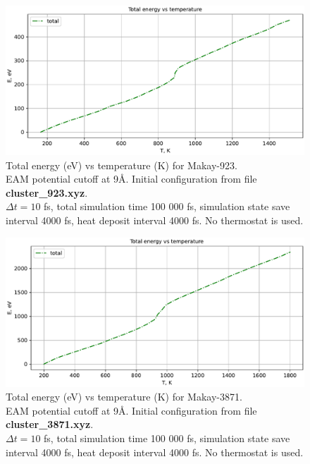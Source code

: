 \documentclass[12pt,a4paper]{article}
\begin{document}
\begin{figure}[h!]
	\centering
	\includegraphics[width=.95\linewidth]{img/milestone07-small.pdf}
	\caption{Total energy (eV) vs temperature (K) for Makay-923.\\
	 	EAM potential cutoff at 9Å. Initial configuration from file {\bf cluster\_923.xyz}.\\
		$\Delta t = 10$ fs, total simulation time 100 000 fs, simulation state save interval 4000 fs, heat deposit interval 4000 fs.
		No thermostat is used.}
	\label{fig:heat-makay1}
\end{figure}

\begin{figure}[h!]
	\centering
	\includegraphics[width=.95\linewidth]{img/milestone07-large.pdf}
	\caption{Total energy (eV) vs temperature (K) for Makay-3871.\\
	EAM potential cutoff at 9Å. Initial configuration from file {\bf cluster\_3871.xyz}.\\
	$\Delta t = 10$ fs, total simulation time 100 000 fs, simulation state save interval 4000 fs, heat deposit interval 4000 fs.
	No thermostat is used.}
	\label{fig:heat-makay2}
\end{figure}

\clearpage
\end{document}
